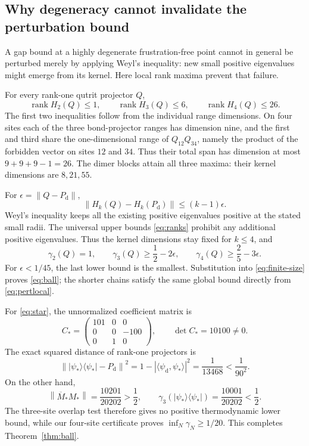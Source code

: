 \documentclass[11pt,a4paper]{article}
\theoremstyle{remark}\newtheorem{remark}[theorem]{Remark}
\newcommand{\ket}[1]{\lvert #1\rangle}
\newcommand{\bra}[1]{\langle #1\rvert}
\newcommand{\norm}[1]{\left\lVert #1\right\rVert}
\newcommand{\rank}{\operatorname{rank}}
\newcommand{\Pd}{P_{\mathrm d}}
\begin{document}
\subsection{Why degeneracy cannot invalidate the perturbation bound}
A gap bound at a highly degenerate frustration-free point cannot in general be perturbed merely by applying Weyl's inequality: new small positive eigenvalues might emerge from its kernel. Here local rank maxima prevent that failure.

For every rank-one qutrit projector $Q$,
\begin{equation}\label{eq:ranks}
 \rank H_2(Q)\le1,\qquad \rank H_3(Q)\le6,\qquad
 \rank H_4(Q)\le26.
\end{equation}
The first two inequalities follow from the individual range dimensions. On four sites each of the three bond-projector ranges has dimension nine, and the first and third share the one-dimensional range of $Q_{12}Q_{34}$, namely the product of the forbidden vector on sites $12$ and $34$. Thus their total span has dimension at most $9+9+9-1=26$. The dimer blocks attain all three maxima: their kernel dimensions are $8,21,55$.

For $\epsilon=\norm{Q-\Pd}$,
\[
 \norm{H_k(Q)-H_k(\Pd)}\le(k-1)\epsilon.
\]
Weyl's inequality keeps all the existing positive eigenvalues positive at the stated small radii. The universal upper bounds \eqref{eq:ranks} prohibit any additional positive eigenvalues. Thus the kernel dimensions stay fixed for $k\le4$, and
\begin{equation}\label{eq:pertlocal}
 \gamma_2(Q)=1,\qquad
 \gamma_3(Q)\ge\frac12-2\epsilon,\qquad
 \gamma_4(Q)\ge\frac25-3\epsilon.
\end{equation}
For $\epsilon<1/45$, the last lower bound is the smallest. Substitution into \eqref{eq:finite-size} proves \eqref{eq:ball}; the shorter chains satisfy the same global bound directly from \eqref{eq:pertlocal}.

For \eqref{eq:star}, the unnormalized coefficient matrix is
\[
 C_* =\begin{pmatrix}101&0&0\\0&0&-100\\0&1&0\end{pmatrix},
 \qquad \det C_*=10100\ne0.
\]
The exact squared distance of rank-one projectors is
\[
 \norm{\ket{\psi_*}\bra{\psi_*}-\Pd}^2
 =1-|\langle\psi_{\mathrm d},\psi_*\rangle|^2
 =\frac1{13468}<\frac1{90^2}.
\]
On the other hand,
\[
 \norm{\overline M_*M_*}=\frac{10201}{20202}>\frac12,
 \qquad \gamma_3(\ket{\psi_*}\bra{\psi_*})=\frac{10001}{20202}<\frac12.
\]
The three-site overlap test therefore gives no positive thermodynamic lower bound, while our four-site certificate proves $\inf_N\gamma_N\ge1/20$. This completes Theorem~\ref{thm:ball}.
\end{document}
